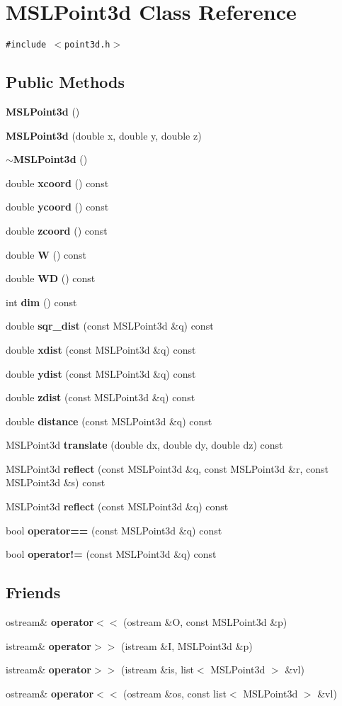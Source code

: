 \section{MSLPoint3d  Class Reference}
\label{class_MSLPoint3d}
{\tt \#include $<$point3d.h$>$}

\subsection*{Public Methods}
\begin{CompactItemize}
\item 
{\bf MSLPoint3d} ()
\item 
{\bf MSLPoint3d} (double x, double y, double z)
\item 
{\bf $\sim$MSLPoint3d} ()
\item 
double {\bf xcoord} () const
\item 
double {\bf ycoord} () const
\item 
double {\bf zcoord} () const
\item 
double {\bf W} () const
\item 
double {\bf WD} () const
\item 
int {\bf dim} () const
\item 
double {\bf sqr\_\-dist} (const MSLPoint3d \&q) const
\item 
double {\bf xdist} (const MSLPoint3d \&q) const
\item 
double {\bf ydist} (const MSLPoint3d \&q) const
\item 
double {\bf zdist} (const MSLPoint3d \&q) const
\item 
double {\bf distance} (const MSLPoint3d \&q) const
\item 
MSLPoint3d {\bf translate} (double dx, double dy, double dz) const
\item 
MSLPoint3d {\bf reflect} (const MSLPoint3d \&q, const MSLPoint3d \&r, const MSLPoint3d \&s) const
\item 
MSLPoint3d {\bf reflect} (const MSLPoint3d \&q) const
\item 
bool {\bf operator==} (const MSLPoint3d \&q) const
\item 
bool {\bf operator!=} (const MSLPoint3d \&q) const
\end{CompactItemize}
\subsection*{Friends}
\begin{CompactItemize}
\item 
ostream\& {\bf operator$<$$<$} (ostream \&O, const MSLPoint3d \&p)
\item 
istream\& {\bf operator$>$$>$} (istream \&I, MSLPoint3d \&p)
\item 
istream\& {\bf operator$>$$>$} (istream \&is, list$<$ MSLPoint3d $>$ \&vl)
\item 
ostream\& {\bf operator$<$$<$} (ostream \&os, const list$<$ MSLPoint3d $>$ \&vl)
\end{CompactItemize}


